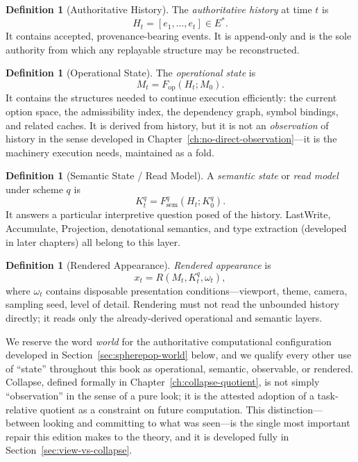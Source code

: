 \documentclass[12pt, a4paper, openany]{book}
\theoremstyle{plain}
\theoremstyle{definition}
\newtheorem{definition}[theorem]{Definition}
\theoremstyle{remark}
\begin{document}
\begin{definition}[Authoritative History]
The \emph{authoritative history} at time $t$ is
\[
H_t = [e_1, \ldots, e_t] \in E^*.
\]
It contains accepted, provenance-bearing events. It is append-only and is the
sole authority from which any replayable structure may be reconstructed.
\end{definition}

\begin{definition}[Operational State]
The \emph{operational state} is
\[
M_t = F_{\mathrm{op}}(H_t; M_0).
\]
It contains the structures needed to continue execution efficiently: the current
option space, the admissibility index, the dependency graph, symbol bindings,
and related caches. It is derived from history, but it is not an
\emph{observation} of history in the sense developed in Chapter~\ref{ch:no-direct-observation}---it is the machinery execution needs, maintained as a fold.
\end{definition}

\begin{definition}[Semantic State / Read Model]
A \emph{semantic state} or \emph{read model} under scheme $q$ is
\[
K_t^q = F_{\mathrm{sem}}^q(H_t; K_0^q).
\]
It answers a particular interpretive question posed of the history. LastWrite,
Accumulate, Projection, denotational semantics, and type extraction (developed
in later chapters) all belong to this layer.
\end{definition}

\begin{definition}[Rendered Appearance]
\emph{Rendered appearance} is
\[
x_t = R(M_t, K_t^q, \omega_t),
\]
where $\omega_t$ contains disposable presentation conditions---viewport, theme,
camera, sampling seed, level of detail. Rendering must not read the unbounded
history directly; it reads only the already-derived operational and semantic
layers.
\end{definition}

We reserve the word \emph{world} for the authoritative computational
configuration developed in Section~\ref{sec:spherepop-world} below, and we
qualify every other use of ``state'' throughout this book as operational,
semantic, observable, or rendered. Collapse, defined formally in
Chapter~\ref{ch:collapse-quotient}, is not simply ``observation'' in the sense
of a pure look; it is the attested adoption of a task-relative quotient as a
constraint on future computation. This distinction---between looking and
committing to what was seen---is the single most important repair this edition
makes to the theory, and it is developed fully in
Section~\ref{sec:view-vs-collapse}.
\end{document}
